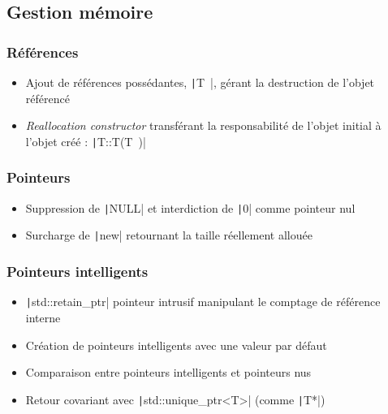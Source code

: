 \documentclass[C++.tex]{subfiles}
\begin{document}
\subsection*{Gestion mémoire}
\begin{frame}[fragile]
	\frametitle{Références}
	\begin{itemize}
		\item Ajout de références possédantes, \texttt|T~|, gérant la destruction de l'objet référencé
		\item \textit{Reallocation constructor} transférant la responsabilité de l'objet initial à l'objet créé : \texttt|T::T(T~)|
	\end{itemize}
\end{frame}

\begin{frame}[fragile]
	\frametitle{Pointeurs}
	\begin{itemize}
		\item Suppression de \texttt|NULL| et interdiction de \texttt|0| comme pointeur nul
		\item Surcharge de \texttt|new| retournant la taille réellement allouée
	\end{itemize}
\end{frame}

\begin{frame}[fragile]
	\frametitle{Pointeurs intelligents}
	\begin{itemize}
		\item \texttt|std::retain_ptr| pointeur intrusif manipulant le comptage de référence interne
		\item Création de pointeurs intelligents avec une valeur par défaut
		\item Comparaison entre pointeurs intelligents et pointeurs nus
		\item Retour covariant avec \texttt|std::unique_ptr<T>| (comme \texttt|T*|)
	\end{itemize}
\end{frame}
\end{document}
